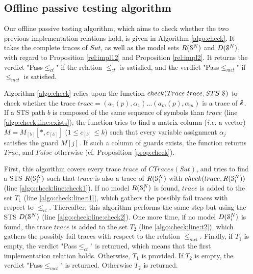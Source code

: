 \subsection{Offline passive testing algorithm}
\label{sec:testing:offline}

Our offline passive testing algorithm, which aims to check
whether the two previous implementation relations hold, is given
in Algorithm \ref{algo:check}. It takes the complete traces of
$\mathit{Sut}$, as well as the model sets $R(\EuScript{S}^{N})$ and
$D(\EuScript{S}^{N})$, with regard to Proposition
\ref{rel:impl12} and Proposition \ref{rel:impl2}. It returns the
verdict "Pass$\leq_{ct}$" if the relation $\leq_{ct}$ is
satisfied, and the verdict "Pass$\leq_{mct}$" if $\leq_{mct}$ is
satisfied.

Algorithm \ref{algo:check} relies upon the function ${check(Trace
~trace, STS ~\EuScript{S})}$ to check whether the trace $trace =
(a_1(p), \alpha_1) \dots (a_m(p), \alpha_m)$ is a trace of
$\EuScript{S}$. If a STS path $b$ is composed of the same
sequence of symbols than $trace$ (line
\ref{algo:check:line:exists}), the function tries to find a
matrix column (\emph{i.e.} a vector) $M = M_{[b]}[*,c_{[b]}]$ ($1
\leq c_{[b]} \leq k$) such that every variable assignment
$\alpha_j$ satisfies the guard $M[j]$. If such a column of guards
exists, the function returns $True$, and $False$ otherwise (cf.
Proposition \ref{prop:check}).

First, this algorithm covers every trace $trace$ of
$CTraces({Sut})$, and tries to find a STS $R(\EuScript{S}_i^{N})$
such that $trace$ is also a trace of $R(\EuScript{S}_i^{N})$ with
$check(trace, R(\EuScript{S}_i^{N}))$ (line
\ref{algo:check:line:check1}).  If no model
$R(\EuScript{S}_i^{N})$ is found, $trace$ is added to the set
$T_1$ (line \ref{algo:check:line:t1}), which gathers the possibly
fail traces with respect to $\leq_{ct}$.
Thereafter, this algorithm performs the same step but using the
STS $D(\EuScript{S}^{N})$ (line \ref{algo:check:line:check2}).
One more time, if no model $D(\EuScript{S}_i^{N})$ is found, the
trace $trace$ is added to the set $T_2$ (line
\ref{algo:check:line:t2}), which gathers the possibly fail
traces with respect to the relation $\leq_{mct}$.
Finally, if $T_1$ is empty, the verdict "Pass$\leq_{ct}$" is
returned, which means that the first implementation relation
holds. Otherwise, $T_1$ is provided. If $T_2$ is empty, the
verdict "Pass$\leq_{mct}$" is returned. Otherwise $T_2$ is
returned.

